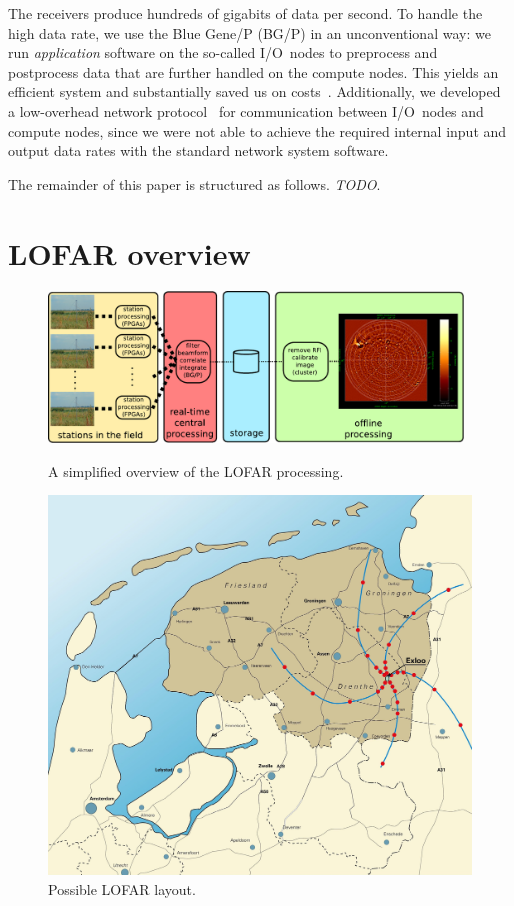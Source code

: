 \documentclass{sig-alternate}
\begin{document}
The receivers produce hundreds of gigabits of data per second.
To handle the high data rate,
we use the Blue Gene/P (BG/P) in an unconventional way: we run
\emph{application\/} software on the so-called I/O~nodes to preprocess and
postprocess data that are further handled on the compute nodes.
This yields an efficient system and substantially saved us on
costs~\cite{Iskra:08}.
Additionally, we developed a low-overhead network protocol~\cite{Romein:09a}
for communication between I/O~nodes and compute nodes, since we were not able
to achieve the required internal input and output data rates with the standard
network system software.

The remainder of this paper is structured as follows.
\emph{TODO}.


\section{LOFAR overview}

\begin{figure}
\begin{minipage}[b]{11cm}
\includegraphics[width=11cm]{lofar-overview.pdf}
\caption{A simplified overview of the LOFAR processing.}
\label{fig:lofar-overview}
\end{minipage}
\hfill
\begin{minipage}[b]{6cm}
\includegraphics[width=\columnwidth]{map.jpg}
\caption{Possible LOFAR layout.}
\label{fig:map}
\end{minipage}
\end{figure}
\end{document}
